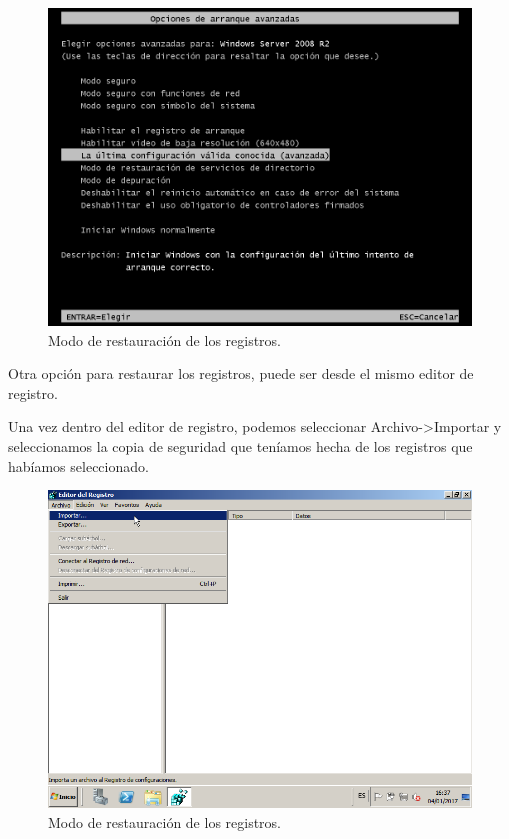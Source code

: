 \begin{figure}[H] %
	\centering
	\includegraphics[scale=0.5]{imagenes/restaurar_F8.png}  %
	\caption{Modo de restauración de los registros.} \label{fig:figura9}
\end{figure}


Otra opción para restaurar los registros, puede ser desde el mismo editor de registro.

Una vez dentro del editor de registro, podemos seleccionar Archivo->Importar y seleccionamos la copia de seguridad que teníamos hecha de los registros que habíamos seleccionado. \cite{rest_regedit}

\begin{figure}[H] %
	\centering
	\includegraphics[scale=0.5]{imagenes/restaurar_regedit.png}  %
	\caption{Modo de restauración de los registros.} \label{fig:figura10}
\end{figure}



